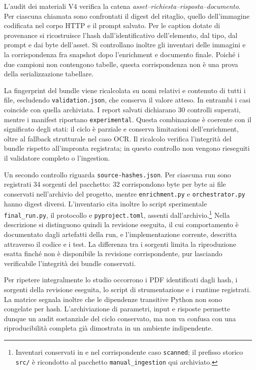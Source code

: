 L'audit dei materiali V4 verifica la catena \emph{asset--richiesta--risposta--documento}. Per ciascuna chiamata sono confrontati il digest del ritaglio, quello dell'immagine codificata nel corpo HTTP e il prompt salvato. Per le caption dotate di provenance si ricostruisce l'hash dall'identificativo dell'elemento, dal tipo, dal prompt e dai byte dell'asset. Si controllano inoltre gli inventari delle immagini e la corrispondenza fra snapshot dopo l'enrichment e documento finale. Poiché i due campioni non contengono tabelle, questa corrispondenza non è una prova della serializzazione tabellare.

La fingerprint del bundle viene ricalcolata su nomi relativi e contenuto di tutti i file, escludendo \texttt{validation.json}, che conserva il valore atteso. In entrambi i casi coincide con quella archiviata. I report salvati dichiarano 30 controlli superati, mentre i manifest riportano \texttt{experimental}. Questa combinazione è coerente con il significato degli stati: il ciclo è parziale e conserva limitazioni dell'enrichment, oltre al fallback strutturale nel caso OCR. Il ricalcolo verifica l'integrità del bundle rispetto all'impronta registrata; in questo controllo non vengono rieseguiti il validatore completo o l'ingestion.

Un secondo controllo riguarda \texttt{source-hashes.json}. Per ciascuna run sono registrati 34 sorgenti del pacchetto: 32 corrispondono byte per byte ai file conservati nell'archivio del progetto, mentre \texttt{enrichment.py} e \texttt{orchestrator.py} hanno digest diversi. L'inventario cita inoltre lo script sperimentale \texttt{final\_run.py}, il protocollo e \texttt{pyproject.toml}, assenti dall'archivio.\footnote{Inventari conservati in  e nel corrispondente caso \texttt{scanned}; il prefisso storico \texttt{src/} è ricondotto al pacchetto \texttt{manual\_ingestion} qui archiviato.} Nella descrizione si distinguono quindi la revisione eseguita, il cui comportamento è documentato dagli artefatti della run, e l'implementazione corrente, descritta attraverso il codice e i test. La differenza tra i sorgenti limita la riproduzione esatta finché non è disponibile la revisione corrispondente, pur lasciando verificabile l'integrità dei bundle conservati.

Per ripetere integralmente lo studio occorrono i PDF identificati dagli hash, i sorgenti della revisione eseguita, lo script di strumentazione e i runtime registrati. La matrice segnala inoltre che le dipendenze transitive Python non sono congelate per hash. L'archiviazione di parametri, input e risposte permette dunque un audit sostanziale del ciclo conservato, ma non va confusa con una riproducibilità completa già dimostrata in un ambiente indipendente.


